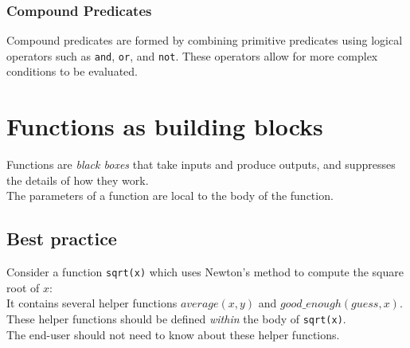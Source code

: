 \documentclass{notes}
\begin{document}
\subsubsection{Compound Predicates}
Compound predicates are formed by combining primitive predicates using logical operators such as \texttt{and}, \texttt{or}, and \texttt{not}. These operators allow for more complex conditions to be evaluated.

\section{Functions as building blocks}
Functions are \emph{black boxes} that take inputs and produce outputs, and suppresses the details of how they work. \\
The parameters of a function are local to the body of the function.

\subsection{Best practice}
Consider a function \texttt{sqrt(x)} which uses Newton's method to compute the square root of \(x\):\\
It contains several helper functions \texttt{\(average(x, y)\)} and \texttt{\(good\_enough(guess, x)\)}.
These helper functions should be defined \emph{within} the body of \texttt{sqrt(x)}.\\
The end-user should not need to know about these helper functions.
\end{document}
